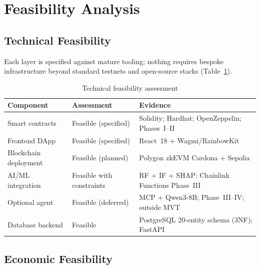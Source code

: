 \documentclass[12pt, a4paper]{report}
\newcommand{\tableheadcolor}{\rowcolor{TableHeadBg}}
\begin{document}
\section{Feasibility Analysis}
\label{sec:feasibility}

\subsection{Technical Feasibility}

Each layer is specified against mature tooling; nothing requires bespoke infrastructure beyond standard testnets and open-source stacks (Table~\ref{tab:tech-feasibility}).

\begin{table}[H]
\centering
\caption[Technical feasibility assessment]{Technical feasibility assessment}
\label{tab:tech-feasibility}
\begin{tabular}{p{3cm}p{3cm}p{7.5cm}}
\toprule
\tableheadcolor
\textbf{Component} & \textbf{Assessment} & \textbf{Evidence} \\
\midrule
Smart contracts & Feasible (specified) & Solidity; Hardhat; OpenZeppelin; Phases~I--II \\
Frontend DApp & Feasible (specified) & React~18 + Wagmi/RainbowKit \\
Blockchain deployment & Feasible (planned) & Polygon zkEVM Cardona + Sepolia \\
AI/ML integration & Feasible with constraints & RF + IF + SHAP; Chainlink Functions Phase~III \\
Optional agent & Feasible (deferred) & MCP + Qwen3-8B; Phase~III--IV; outside MVT \\
Database backend & Feasible & PostgreSQL 20-entity schema (3NF); FastAPI \\
\bottomrule
\end{tabular}
\end{table}

\vspace{2pt}

\subsection{Economic Feasibility}
\end{document}
